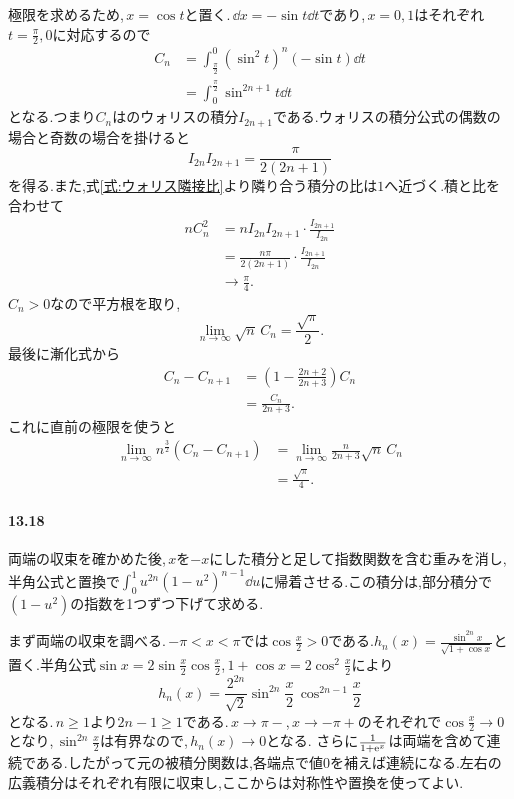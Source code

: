 極限を求めるため,\,$x=\cos t$と置く.\,$\dd x=-\sin t\dd t$であり,\,$x=0,1$はそれぞれ$t=\frac\pi2,0$に対応するので
\[
 \begin{aligned}
 C_n&=\int_{\frac\pi2}^0(\sin^2t)^n(-\sin t)\dd t\\
 &=\int_0^{\frac\pi2}\sin^{2n+1}t\dd t
 \end{aligned}
\]
となる.つまり$C_n$はのウォリスの積分$I_{2n+1}$である.ウォリスの積分公式の偶数の場合と奇数の場合を掛けると
\[
 I_{2n}I_{2n+1}=\frac{\pi}{2(2n+1)}
\]
を得る.また,式\eqref{式:ウォリス隣接比}より隣り合う積分の比は$1$へ近づく.積と比を合わせて
\[
 \begin{aligned}
 nC_n^2
 &=nI_{2n}I_{2n+1}\cdot\frac{I_{2n+1}}{I_{2n}}\\
 &=\frac{n\pi}{2(2n+1)}\cdot\frac{I_{2n+1}}{I_{2n}}\\
 &\longrightarrow\frac\pi4.
 \end{aligned}
\]
$C_n>0$なので平方根を取り,
\[
 \boxed{\lim_{n\to\infty}\sqrt n\,C_n=\frac{\sqrt\pi}{2}}.
\]
最後に漸化式から
\[
 \begin{aligned}
 C_n-C_{n+1}
 &=\left(1-\frac{2n+2}{2n+3}\right)C_n\\
 &=\frac{C_n}{2n+3}.
 \end{aligned}
\]
これに直前の極限を使うと
\[
 \begin{aligned}
 \lim_{n\to\infty}n^{\frac32}(C_n-C_{n+1})
 &=\lim_{n\to\infty}\frac{n}{2n+3}\sqrt n\,C_n\\
 &=\boxed{\frac{\sqrt\pi}{4}}.
 \end{aligned}
\]

\paragraph{13.18}
両端の収束を確かめた後,\,$x$を$-x$にした積分と足して指数関数を含む重みを消し,半角公式と置換で$\int_0^1u^{2n}(1-u^2)^{n-1}\dd u$に帰着させる.この積分は,部分積分で$(1-u^2)$の指数を1つずつ下げて求める.

まず両端の収束を調べる.\,$-\pi<x<\pi$では$\cos\frac x2>0$である.$h_n(x)=\frac{\sin^{2n}x}{\sqrt{1+\cos x}}$と置く.半角公式$\sin x=2\sin\frac x2\cos\frac x2$,\,$1+\cos x=2\cos^2\frac x2$により
\[
 h_n(x)
 =\frac{2^{2n}}{\sqrt2}
   \sin^{2n}\frac x2\,\cos^{2n-1}\frac x2
\]
となる.\,$n\ge1$より$2n-1\ge1$である.\,$x\to\pi-$,\,$x\to-\pi+$のそれぞれで$\cos\frac x2\to0$となり,\,$\sin^{2n}\frac x2$は有界なので,\,$h_n(x)\to0$となる.
さらに$\frac1{1+\mathrm{e}^x}$は両端を含めて連続である.したがって元の被積分関数は,各端点で値$0$を補えば連続になる.左右の広義積分はそれぞれ有限に収束し,ここからは対称性や置換を使ってよい.

